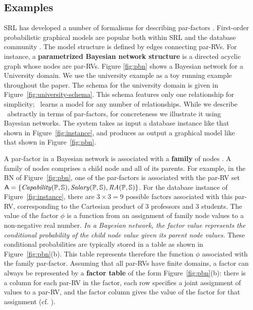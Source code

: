 \subsection{Examples} \label{sec:examples} SRL has developed a number of formalisms for describing par-factors \cite{Kimmig2015}. 
First-order probabilistic graphical models
are popular both within SRL and the database community \cite{Kimmig2015,Wang2008}. The model structure is defined by edges connecting par-RVs. For instance, a \textbf{parametrized Bayesian network structure} is a directed acyclic graph whose nodes are par-RVs.  Figure \ref{fig:pbn} shows a Bayesian network for a University domain. We use the university example as a toy running example throughout the paper. The schema for the university domain is given in Figure~\ref{fig:university-schema}. This schema features only one relationship for simplicity; \FB\ learns a model for any number of relationships. While we describe \FB\ abstractly in terms of par-factors, for concreteness we illustrate it using Bayesian networks. The system takes as input a database instance like that shown in Figure~\ref{fig:instance}, and produces as output a graphical model like that shown in Figure~\ref{fig:pbn}.  


A par-factor in a Bayesian network is associated with a \textbf{family} of nodes \cite[Sec.2.2.1]{Kimmig2015}. A family of nodes comprises a child node and all of its parents. For example, in the BN of Figure~\ref{fig:pbn}, one of the par-factors is associated with the par-RV set $\mathsf{A}=\{\it{Capability}(\mathbb{P},\mathbb{S}),\it{Salary}(\mathbb{P},\mathbb{S}),\it{RA}(\mathbb{P},\mathbb{S})\}$. For the database instance of Figure~\ref{fig:instance}, there are $3\times3=9$ possible factors associated with this par-RV, corresponding to the Cartesian product of 3 professors and 3 students. The value of the factor $\phi$ is a function from an assignment of family node values to a non-negative real number. {\em In a Bayesian network, the factor value represents the conditional probability of the child node value given its parent node values.} These conditional probabilities are typically stored in a table as shown in Figure~\ref{fig:pbn}(b). This table represents therefore the function $\phi$ associated with the family par-factor. Assuming that all par-RVs have finite domains, a factor can always be represented by a \textbf{factor table} of the form Figure~\ref{fig:pbn}(b): there is a column for each par-RV in the factor, each row specifies a joint assignment of values to a par-RV, and the factor column gives the value of the factor for that assignment (cf. \cite[Sec.2.2.1]{Kimmig2015}).


